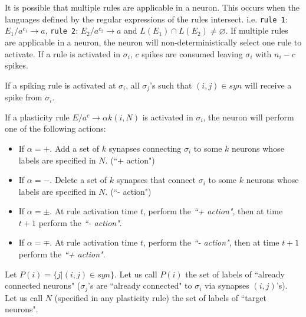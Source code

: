 \documentclass[runningheads,a4paper]{llncs}
\begin{document}
It is possible that multiple rules are applicable in a neuron. This occurs when the languages defined by the regular expressions of the rules 
intersect. i.e. \texttt{rule 1}: $E_1/a^{c_1} \rightarrow a$, \texttt{rule 2}: $E_2/a^{c_2} \rightarrow a$ and $L(E_1) \cap L(E_2) \neq \varnothing$. 
If multiple rules are applicable in a neuron, the neuron will non-deterministically select one rule to activate. If a rule is activated in $\sigma_i$,
$c$ spikes are consumed leaving $\sigma_i$ with $n_i-c$ spikes.
  
If a spiking rule is activated at $\sigma_i$, all $\sigma_j$'s such that $(i,j) \in syn$ will receive a spike from $\sigma_i$.
  
If a plasticity rule $E/a^c \rightarrow \alpha k(i, {N})$ is activated in $\sigma_i$, the neuron will perform one of the following actions:
\begin{itemize}
   \item If $\alpha = +$. Add a set of $k$ synapses connecting $\sigma_i$ to some $k$ neurons whose labels are specified in $N$. (``+ action")
   \item If $\alpha = -$. Delete a set of $k$ synapses that connect $\sigma_i$ to some $k$ neurons whose labels are specified in $N$. (``- action")
   \item If $\alpha = \pm$. At rule activation time $t$, perform the \textit{``+ action"}, then at time $t+1$ perform the \textit{``- action"}.
   \item If $\alpha = \mp$. At rule activation time $t$, perform the \textit{``- action"}, then at time $t+1$ perform the \textit{``+ action"}.
\end{itemize}
  
Let $P(i) = \{j|(i,j)\in syn\}$. Let us call $P(i)$ the set of labels of ``already connected neurons" ($\sigma_j$'s are ``already connected" to 
$\sigma_i$ via synapses $(i,j)$'s). Let us call $N$ (specified in any plasticity rule) the set of labels of ``target neurons".
\end{document}
